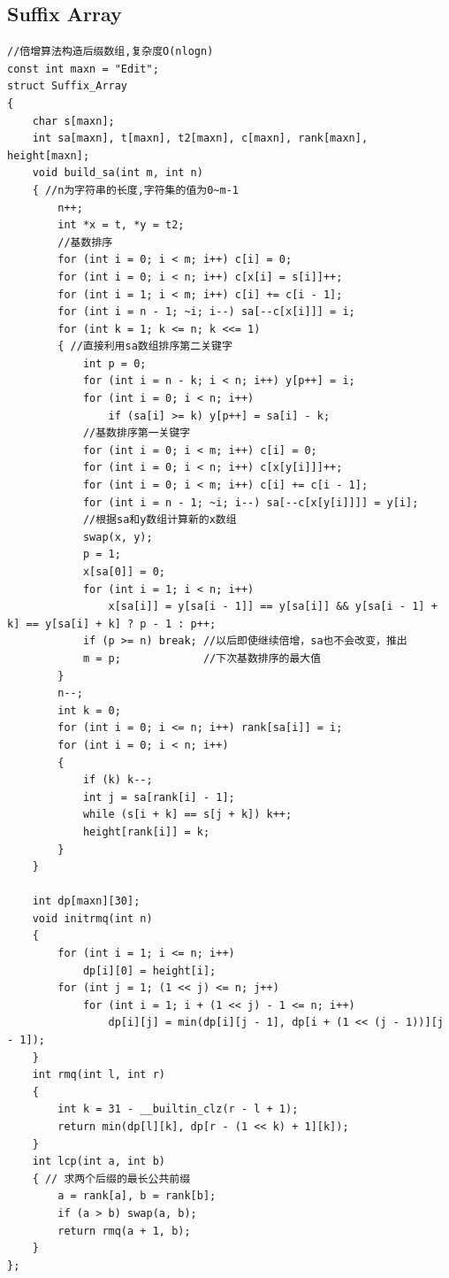 \documentclass[twoside]{article}
\begin{document}
\subsection{Suffix Array}

\begin{lstlisting}
//倍增算法构造后缀数组,复杂度O(nlogn)
const int maxn = "Edit";
struct Suffix_Array
{
    char s[maxn];
    int sa[maxn], t[maxn], t2[maxn], c[maxn], rank[maxn], height[maxn];
    void build_sa(int m, int n)
    { //n为字符串的长度,字符集的值为0~m-1
        n++;
        int *x = t, *y = t2;
        //基数排序
        for (int i = 0; i < m; i++) c[i] = 0;
        for (int i = 0; i < n; i++) c[x[i] = s[i]]++;
        for (int i = 1; i < m; i++) c[i] += c[i - 1];
        for (int i = n - 1; ~i; i--) sa[--c[x[i]]] = i;
        for (int k = 1; k <= n; k <<= 1)
        { //直接利用sa数组排序第二关键字
            int p = 0;
            for (int i = n - k; i < n; i++) y[p++] = i;
            for (int i = 0; i < n; i++)
                if (sa[i] >= k) y[p++] = sa[i] - k;
            //基数排序第一关键字
            for (int i = 0; i < m; i++) c[i] = 0;
            for (int i = 0; i < n; i++) c[x[y[i]]]++;
            for (int i = 0; i < m; i++) c[i] += c[i - 1];
            for (int i = n - 1; ~i; i--) sa[--c[x[y[i]]]] = y[i];
            //根据sa和y数组计算新的x数组
            swap(x, y);
            p = 1;
            x[sa[0]] = 0;
            for (int i = 1; i < n; i++)
                x[sa[i]] = y[sa[i - 1]] == y[sa[i]] && y[sa[i - 1] + k] == y[sa[i] + k] ? p - 1 : p++;
            if (p >= n) break; //以后即使继续倍增，sa也不会改变，推出
            m = p;             //下次基数排序的最大值
        }
        n--;
        int k = 0;
        for (int i = 0; i <= n; i++) rank[sa[i]] = i;
        for (int i = 0; i < n; i++)
        {
            if (k) k--;
            int j = sa[rank[i] - 1];
            while (s[i + k] == s[j + k]) k++;
            height[rank[i]] = k;
        }
    }
    
    int dp[maxn][30];
    void initrmq(int n)
    {
        for (int i = 1; i <= n; i++)
            dp[i][0] = height[i];
        for (int j = 1; (1 << j) <= n; j++)
            for (int i = 1; i + (1 << j) - 1 <= n; i++)
                dp[i][j] = min(dp[i][j - 1], dp[i + (1 << (j - 1))][j - 1]);
    }
    int rmq(int l, int r)
    {
        int k = 31 - __builtin_clz(r - l + 1);
        return min(dp[l][k], dp[r - (1 << k) + 1][k]);
    }
    int lcp(int a, int b)
    { // 求两个后缀的最长公共前缀
        a = rank[a], b = rank[b];
        if (a > b) swap(a, b);
        return rmq(a + 1, b);
    }
};
\end{lstlisting}
\end{document}
